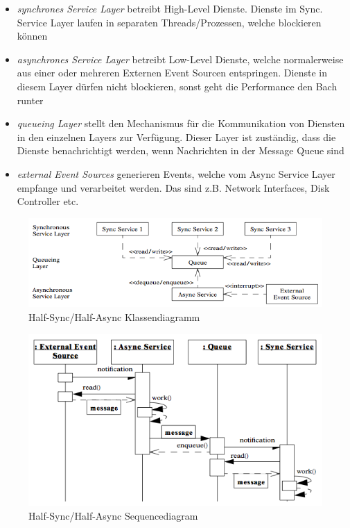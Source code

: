 \begin{itemize}
	\item \emph{synchrones Service Layer} betreibt High-Level Dienste. Dienste im Sync. Service Layer laufen in separaten Threads/Prozessen, welche blockieren können
	\item \emph{asynchrones Service Layer} betreibt Low-Level Dienste, welche normalerweise aus einer oder mehreren Externen Event Sourcen entspringen. Dienste in diesem Layer dürfen nicht blockieren, sonst geht die Performance den Bach runter
	\item \emph{queueing Layer} stellt den Mechanismus für die Kommunikation von Diensten in den einzelnen Layers zur Verfügung. Dieser Layer ist zuständig, dass die Dienste benachrichtigt werden, wenn Nachrichten in der Message Queue sind
	\item \emph{external Event Sources} generieren Events, welche vom Async Service Layer empfange und verarbeitet werden. Das sind z.B. Network Interfaces, Disk Controller etc.
\end{itemize}

\begin{figure}[H]
	\centering
	\includegraphics[width=\textwidth]{content/posa2/half-sync-half-async/images/Bildschirmfoto_2013-05-13_um_1.png}
	\caption{Half-Sync/Half-Async Klassendiagramm}
\end{figure}

\begin{figure}[H]
	\centering
	\includegraphics[width=\textwidth]{content/posa2/half-sync-half-async/images/Bildschirmfoto_2013-05-13_um_2.png}
	\caption{Half-Sync/Half-Async Sequencediagram}
\end{figure}


